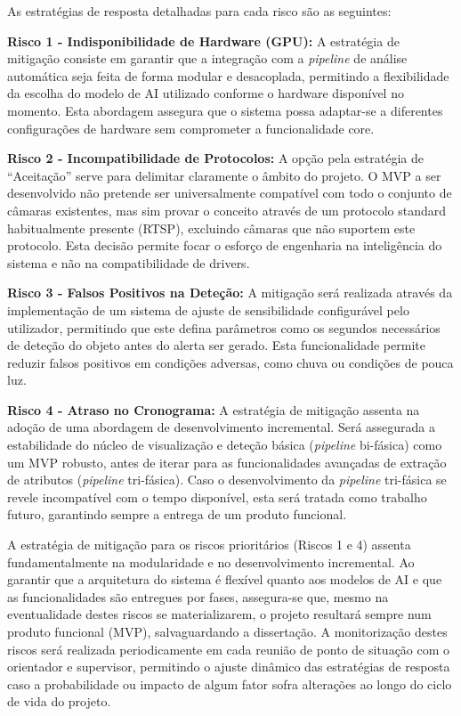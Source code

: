 As estratégias de resposta detalhadas para cada risco são as seguintes:

\textbf{Risco 1 - Indisponibilidade de Hardware (\gls{GPU}):} A estratégia de mitigação consiste em garantir que a integração com a \textit{pipeline} de análise automática seja feita de forma modular e desacoplada, permitindo a flexibilidade da escolha do modelo de \gls{AI} utilizado conforme o hardware disponível no momento. Esta abordagem assegura que o sistema possa adaptar-se a diferentes configurações de hardware sem comprometer a funcionalidade core.

\textbf{Risco 2 - Incompatibilidade de Protocolos:} A opção pela estratégia de ``Aceitação'' serve para delimitar claramente o âmbito do projeto. O \gls{MVP} a ser desenvolvido não pretende ser universalmente compatível com todo o conjunto de câmaras existentes, mas sim provar o conceito através de um protocolo standard habitualmente presente (\gls{RTSP}), excluindo câmaras que não suportem este protocolo. Esta decisão permite focar o esforço de engenharia na inteligência do sistema e não na compatibilidade de drivers.

\textbf{Risco 3 - Falsos Positivos na Deteção:} A mitigação será realizada através da implementação de um sistema de ajuste de sensibilidade configurável pelo utilizador, permitindo que este defina parâmetros como os segundos necessários de deteção do objeto antes do alerta ser gerado. Esta funcionalidade permite reduzir falsos positivos em condições adversas, como chuva ou condições de pouca luz.

\textbf{Risco 4 - Atraso no Cronograma:} A estratégia de mitigação assenta na adoção de uma abordagem de desenvolvimento incremental. Será assegurada a estabilidade do núcleo de visualização e deteção básica (\textit{pipeline} bi-fásica) como um \gls{MVP} robusto, antes de iterar para as funcionalidades avançadas de extração de atributos (\textit{pipeline} tri-fásica). Caso o desenvolvimento da \textit{pipeline} tri-fásica se revele incompatível com o tempo disponível, esta será tratada como trabalho futuro, garantindo sempre a entrega de um produto funcional.

A estratégia de mitigação para os riscos prioritários (Riscos 1 e 4) assenta fundamentalmente na modularidade e no desenvolvimento incremental. Ao garantir que a arquitetura do sistema é flexível quanto aos modelos de \gls{AI} e que as funcionalidades são entregues por fases, assegura-se que, mesmo na eventualidade destes riscos se materializarem, o projeto resultará sempre num produto funcional (\gls{MVP}), salvaguardando a dissertação. A monitorização destes riscos será realizada periodicamente em cada reunião de ponto de situação com o orientador e supervisor, permitindo o ajuste dinâmico das estratégias de resposta caso a probabilidade ou impacto de algum fator sofra alterações ao longo do ciclo de vida do projeto.
